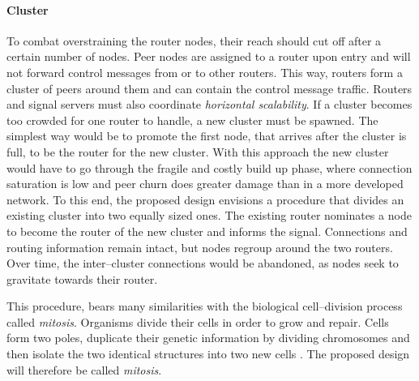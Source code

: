 \paragraph{Cluster}
To combat overstraining the router nodes, their reach should cut off after a certain number of nodes. Peer nodes are assigned to a router upon entry and will not forward control messages from or to other routers. This way, routers form a cluster of peers around them and can contain the control message traffic. Routers and signal servers must also coordinate \textit{horizontal scalability}. If a cluster becomes too crowded for one router to handle, a new cluster must be spawned. The simplest way would be to promote the first node, that arrives after the cluster is full, to be the router for the new cluster. With this approach the new cluster would have to go through the fragile and costly build up phase, where connection saturation is low and peer churn does greater damage than in a more developed network. To this end, the proposed design envisions a procedure that divides an existing cluster into two equally sized ones. The existing router nominates a node to become the router of the new cluster and informs the signal. Connections and routing information remain intact, but nodes regroup around the two routers. Over time, the inter–cluster connections would be abandoned, as nodes seek to gravitate towards their router.

This procedure, bears many similarities with the biological cell–division process called \textit{mitosis}. Organisms divide their cells in order to grow and repair. Cells form two poles, duplicate their genetic information by dividing chromosomes and then isolate the two identical structures into two new cells \cite{mitosis-britannica}. The proposed design will therefore be called \textit{mitosis}.
